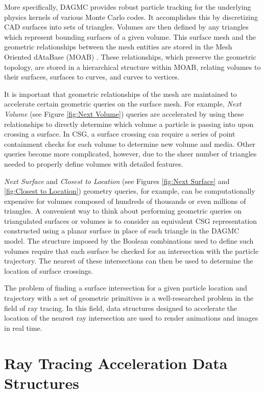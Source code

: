 More specifically, DAGMC provides robust particle tracking for the underlying
physics kernels of various Monte Carlo codes. It accomplishes this by
discretizing CAD surfaces into sets of triangles. Volumes are then defined by
any triangles which represent bounding surfaces of a given volume. This surface
mesh and the geometric relationships between the mesh entities are stored in the
Mesh Oriented dAtaBase (MOAB) \cite{Tautges_2004}. These relationships, which
preserve the geometric topology, are stored in a hierarchical structure within
MOAB, relating volumes to their surfaces, surfaces to curves, and curves to
vertices.

It is important that geometric relationships of the mesh are maintained to
accelerate certain geometric queries on the surface mesh. For example,
\textit{Next Volume} (see Figure \ref{fig:Next Volume}) queries are accelerated
by using these relationships to directly determine which volume a particle is
passing into upon crossing a surface. In CSG, a surface crossing can require a
series of point containment checks for each volume to determine new volume and
media. Other queries become more complicated, however, due to the sheer number
of triangles needed to properly define volumes with detailed features.

\textit{Next Surface} and \textit{Closest to Location} (see Figures
\ref{fig:Next Surface} and \ref{fig:Closest to Location}) geometry queries, for
example, can be computationally expensive for volumes composed of hundreds of
thousands or even millions of triangles. A convenient way to think about
performing geometric queries on triangulated surfaces or volumes is to consider
an equivalent CSG representation constructed using a planar surface in place of
each triangle in the DAGMC model. The structure imposed by the Boolean
combinations used to define such volumes require that each surface be checked
for an intersection with the particle trajectory. The nearest of these
intersections can then be used to determine the location of surface crossings.

The problem of finding a surface intersection for a given particle location and
trajectory with a set of geometric primitives is a well-researched problem in
the field of ray tracing. In this field, data structures designed to accelerate
the location of the nearest ray intersection are used to render animations and
images in real time.

\section{Ray Tracing Acceleration Data Structures}

